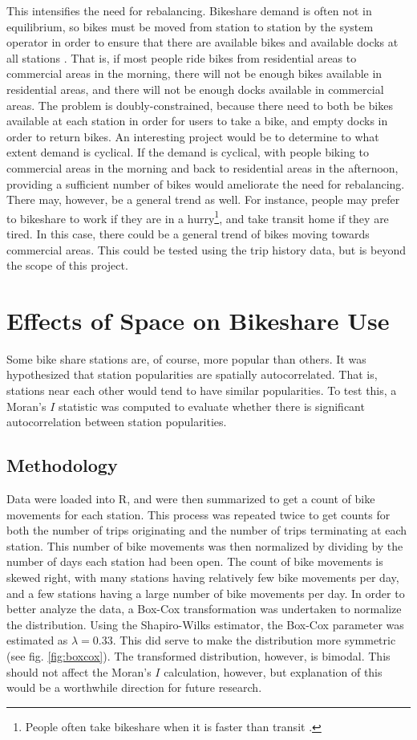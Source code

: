 \documentclass[letterpaper,11pt]{article}
\begin{document}
This intensifies the need for rebalancing. Bikeshare demand is often
not in equilibrium, so bikes must be moved from station to station by
the system operator in order to ensure that there are available bikes
and available docks at all stations \autocite[108]{IDAE2007}. That is,
if most people ride bikes from residential areas to commercial areas
in the morning, there will not be enough bikes available in
residential areas, and there will not be enough docks available in
commercial areas. The problem is doubly-constrained, because there
need to both be bikes available at each station in order for users to
take a bike, and empty docks in order to return bikes. An interesting
project would be to determine to what extent demand is cyclical. If
the demand is cyclical, with people biking to commercial areas in the
morning and back to residential areas in the afternoon, providing a
sufficient number of bikes would ameliorate the need for rebalancing.
There may, however, be a general trend as well. For instance, people
may prefer to bikeshare to work if they are in a hurry\footnote{People
  often take bikeshare when it is faster than transit
  \autocite{Wong2012}.}, and take transit home if they are tired. In
this case, there could be a general trend of bikes moving towards
commercial areas. This could be tested using the trip history data,
but is beyond the scope of this project.

\section{Effects of Space on Bikeshare Use}

Some bike share stations are, of course, more popular than others. It
was hypothesized that station popularities are spatially
autocorrelated. That is, stations near each other would tend to have
similar popularities. To test this, a Moran's $I$ statistic was
computed to evaluate whether there is significant autocorrelation
between station popularities.

\subsection{Methodology}

Data were loaded into R, and were then summarized to get a count of
bike movements for each station. This process was repeated twice to
get counts for both the number of trips originating and the number of
trips terminating at each station. This number of bike movements was
then normalized by dividing by the number of days each station had
been open. The count of bike movements is skewed right, with many
stations having relatively few bike movements per day, and a few
stations having a large number of bike movements per day. In order to
better analyze the data, a Box-Cox transformation was undertaken to
normalize the distribution. Using the Shapiro-Wilks estimator, the
Box-Cox parameter was estimated as $\lambda = 0.33$. This did serve to
make the distribution more symmetric (see fig. \ref{fig:boxcox}). The
transformed distribution, however, is bimodal. This should not affect
the Moran's $I$ calculation, however, but explanation of this would be
a worthwhile direction for future research.
\end{document}
